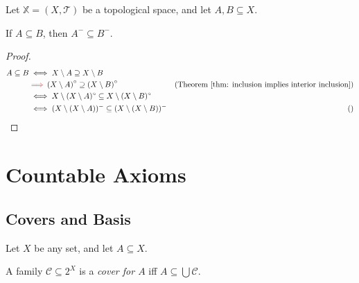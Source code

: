 \begin{theorem}
	\label{thm: inclusion implies closure inclusion}
	Let $\mathbb X = (X, \mathcal T)$ be a topological space, and let $A, B \subseteq X$.
	
	If $A \subseteq B$, then $A^- \subseteq B^-$.
	
	\begin{proof}
		$$
		\begin{aligned}
			A \subseteq B &\iff X \setminus A \supseteq X \setminus B
				& \\
			&\textcolor{red}{\implies} \left(X \setminus A \right)^\circ \supseteq \left( X \setminus B \right)^\circ
				&\text{(Theorem \ref{thm: inclusion implies interior inclusion})} \\
			&\iff X \setminus (X \setminus A)^\circ  \subseteq X \setminus (X \setminus B)^\circ
				& \\
			&\iff (X \setminus (X \setminus A))^- \subseteq (X \setminus (X \setminus B))^-
				& \text{()} \\
		\end{aligned}
		$$
	\end{proof}
\end{theorem}


\chapter{Countable Axioms}


\section{Covers and Basis}


\begin{definition}
	Let $X$ be any set, and let $A \subseteq X$.
	
	A family $\mathcal C \subseteq 2^X$ is a \textit{cover for $A$} iff $A \subseteq \bigcup \mathcal C$.
\end{definition}


